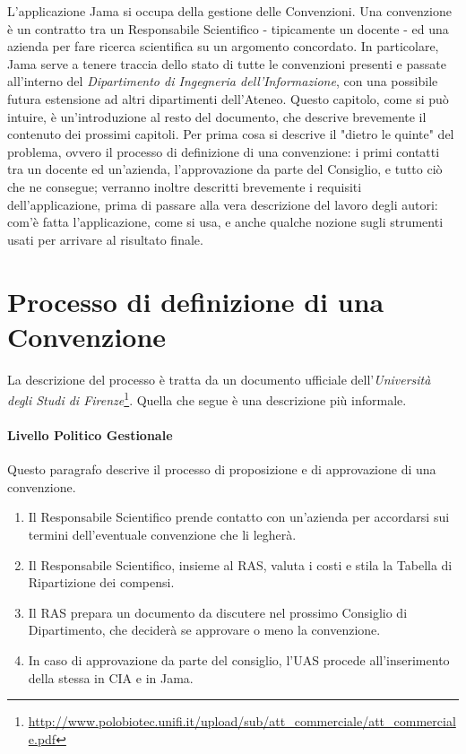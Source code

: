 L'applicazione Jama si occupa della gestione delle Convenzioni. Una convenzione è un contratto tra un Responsabile Scientifico - tipicamente un docente - ed una azienda per fare ricerca scientifica su un argomento concordato. In particolare, Jama serve a tenere traccia dello stato di tutte le convenzioni presenti e passate all'interno del \textsl{Dipartimento di Ingegneria dell'Informazione}, con una possibile futura estensione ad altri dipartimenti dell'Ateneo.\newline
Questo capitolo, come si può intuire, è un'introduzione al resto del documento, che descrive brevemente il contenuto dei prossimi capitoli.\newline
Per prima cosa si descrive il "dietro le quinte" del problema, ovvero il processo di definizione di una convenzione: i primi contatti tra un docente ed un'azienda, l'approvazione da parte del Consiglio, e tutto ciò che ne consegue; verranno inoltre descritti brevemente i requisiti dell'applicazione, prima di passare alla vera descrizione del lavoro degli autori: com'è fatta l'applicazione, come si usa, e anche qualche nozione sugli strumenti usati per arrivare al risultato finale.

\section{Processo di definizione di una Convenzione}
La descrizione del processo è tratta da un documento ufficiale dell'\textsl{Università degli Studi di Firenze}\footnote{\url{http://www.polobiotec.unifi.it/upload/sub/att_commerciale/att_commerciale.pdf}}. Quella che segue è una descrizione più informale.

\paragraph{Livello Politico Gestionale}
Questo paragrafo descrive il processo di proposizione e di approvazione di una convenzione.\newline
\begin{enumerate}
\item Il Responsabile Scientifico prende contatto con un'azienda per accordarsi sui termini dell'eventuale convenzione che li legherà.
\item
Il Responsabile Scientifico, insieme al RAS, valuta i costi e stila la Tabella di Ripartizione dei compensi.
\item Il RAS prepara un documento da discutere nel prossimo Consiglio di Dipartimento, che deciderà se approvare o meno la convenzione.
\item In caso di approvazione da parte del consiglio, l'UAS procede all'inserimento della stessa in CIA e in Jama.\newpage
\end{enumerate}
